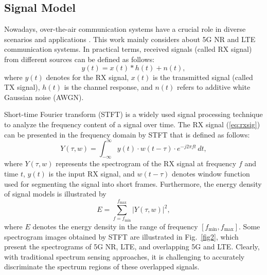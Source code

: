 \documentclass[conference]{IEEEtran} %
\begin{document}
\subsection{Signal Model}
Nowadays, over-the-air communication systems have a crucial role in diverse scenarios and applications \cite{lin20215g}. This work mainly considers about 5G NR and LTE communication systems. In practical terms, received signals (called RX signal) from different sources can be defined as follows:
\begin{equation}
    {y(t) = x(t) \ast h(t) + n(t)},
    \label{eq:rxsig}
\end{equation}
where ${y(t)}$ denotes for the RX signal, ${x(t)}$ is the transmitted signal (called TX signal),  ${h(t)}$ is the channel response, and ${n(t)}$ refers to additive white Gaussian noise (AWGN).




Short-time Fourier transform (STFT) is a widely used signal processing technique to analyze the frequency content of a signal over time. The RX signal (\ref{eq:rxsig}) can be presented in the frequency domain by STFT that is defined as follows:
\begin{equation}
    {Y(\tau, w) = \int_{-\infty}^{\infty} y(t) \cdot w(t - \tau) \cdot e^{-j2\pi ft} \, dt},
    \label{eq:spectrogram}
\end{equation}
where ${Y(\tau, w)}$ represents the spectrogram of the RX signal at frequency ${f}$ and time ${t}$, ${y(t)}$ is the input RX signal, and ${w(t - \tau)}$ denotes window function used for segmenting the signal into short frames. 
Furthermore, the energy density of signal models is illustrated by 
\begin{equation}
    {E = \sum_{f = f_{\min} }^{f_{\max}} \left| Y(\tau, w) \right|^2},
    \label{eq:energy}
\end{equation}
where $E$ denotes the energy density in the range of frequency ${\left [ f_{\min}, f_{\max} \right ]}$.
Some spectrogram images obtained by STFT are illustrated in Fig.~\ref{fig2}, which present the spectrograms of 5G NR, LTE, and overlapping 5G and LTE. 
Clearly, with traditional spectrum sensing approaches, it is challenging to accurately discriminate the spectrum regions of these overlapped signals.
\end{document}
